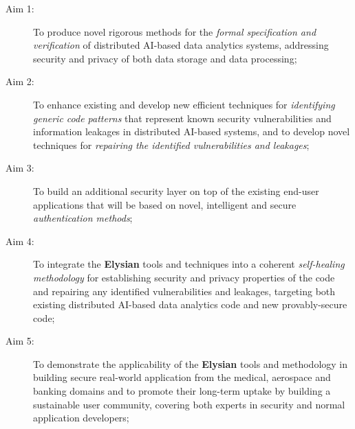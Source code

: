 \documentclass[a4paper,11pt]{article}
\newcommand{\project}[1]{\textbf{#1}\xspace}
\newcommand{\SECURITY}{\project{Elysian}}
\newcommand{\TheProject}{\SECURITY}
\begin{document}
\begin{description}
\item[Aim 1:] To produce novel rigorous methods for the \emph{formal specification and verification} of 
  distributed AI-based data analytics systems, addressing security and privacy of both data storage and data processing;

\item[Aim 2:] To %
enhance existing and develop new efficient techniques for \emph{identifying generic code patterns} that
  represent known security vulnerabilities and information leakages in distributed AI-based systems, and to develop novel techniques for  
  \emph{repairing the identified vulnerabilities and leakages};

\item[Aim 3:] To build an additional security layer on top of the existing end-user applications that will be based on novel, intelligent and secure \emph{authentication methods};

\item[Aim 4:] To integrate the \TheProject{} tools and techniques into a coherent \emph{self-healing methodology} for establishing
  security and privacy properties of the code and repairing any identified vulnerabilities and leakages, targeting both 
  existing distributed AI-based data analytics code and new provably-secure code;

\item[Aim 5:]  To demonstrate the applicability of the \TheProject{} tools and
 methodology in building secure real-world application from the medical, aerospace and
 banking domains and to promote their long-term uptake by building a sustainable user community,
 covering both experts in security and normal application developers;

\end{description}
\end{document}
